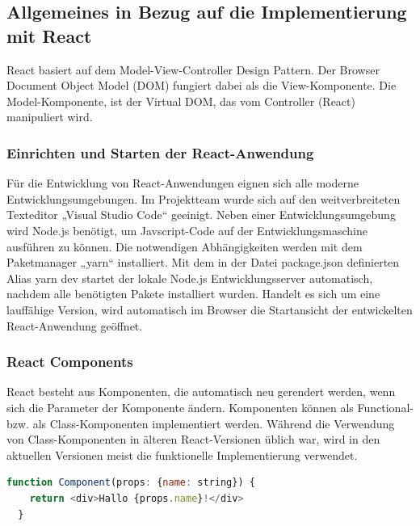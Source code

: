 \subsection{Allgemeines in Bezug auf die Implementierung mit React}
\label{sub:reactGeneral}

React basiert auf dem Model-View-Controller Design Pattern. Der Browser Document Object Model (DOM) fungiert dabei als die View-Komponente. Die Model-Komponente, ist der Virtual DOM, das vom Controller (React) manipuliert wird.

\subsubsection{Einrichten und Starten der React-Anwendung}
\label{sub:reactSetup}

Für die Entwicklung von React-Anwendungen eignen sich alle moderne Entwicklungsumgebungen. Im Projektteam wurde sich auf den weitverbreiteten Texteditor „Visual Studio Code“ geeinigt. Neben einer Entwicklungsumgebung wird Node.js benötigt, um Javscript-Code auf der Entwicklungsmaschine ausführen zu können. Die notwendigen Abhängigkeiten werden mit dem Paketmanager „yarn“ installiert.
Mit dem in der Datei package.json definierten Alias yarn dev startet der lokale Node.js Entwicklungsserver automatisch, nachdem alle benötigten Pakete installiert wurden.
Handelt es sich um eine lauffähige Version, wird automatisch im Browser die Startansicht der entwickelten React-Anwendung geöffnet.

\subsubsection{React Components}
\label{sub:reactComponents}

React besteht aus Komponenten, die automatisch neu gerendert werden, wenn sich die Parameter der Komponente ändern.
Komponenten können als Functional- bzw. als Class-Komponenten implementiert werden.
Während die Verwendung von Class-Komponenten in älteren React-Versionen üblich war, wird in den aktuellen Versionen meist die funktionelle Implementierung verwendet.

\begin{lstlisting}[language=JavaScript, label=reactComponent, title={Beispiel einer React-Komponente}]
  function Component(props: {name: string}) {
    return <div>Hallo {props.name}!</div>
  }
\end{lstlisting}

